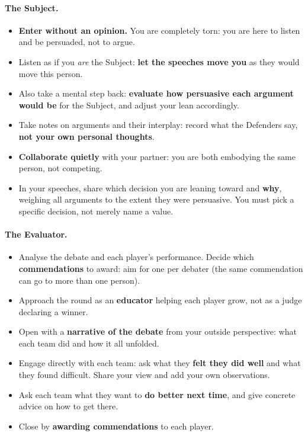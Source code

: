\paragraph{The Subject.}
\begin{itemize}
    \item \textbf{Enter without an opinion.} You are completely torn: you are here to listen and be persuaded, not to argue.
    \item Listen as if you \textit{are} the Subject: \textbf{let the speeches move you} as they would move this person.
    \item Also take a mental step back: \textbf{evaluate how persuasive each argument would be} for the Subject, and adjust your lean accordingly.
    \item Take notes on arguments and their interplay: record what the Defenders say, \textbf{not your own personal thoughts}.
    \item \textbf{Collaborate quietly} with your partner: you are both embodying the same person, not competing.
    \item In your speeches, share which decision you are leaning toward and \textbf{why}, weighing all arguments to the extent they were persuasive. You must pick a specific decision, not merely name a value.
\end{itemize}

\paragraph{The Evaluator.}
\begin{itemize}
    \item Analyse the debate and each player's performance. Decide which \textbf{commendations} to award: aim for one per debater (the same commendation can go to more than one person).
    \item Approach the round as an \textbf{educator} helping each player grow, not as a judge declaring a winner.
    \item Open with a \textbf{narrative of the debate} from your outside perspective: what each team did and how it all unfolded.
    \item Engage directly with each team: ask what they \textbf{felt they did well} and what they found difficult. Share your view and add your own observations.
    \item Ask each team what they want to \textbf{do better next time}, and give concrete advice on how to get there.
    \item Close by \textbf{awarding commendations} to each player.
\end{itemize}

